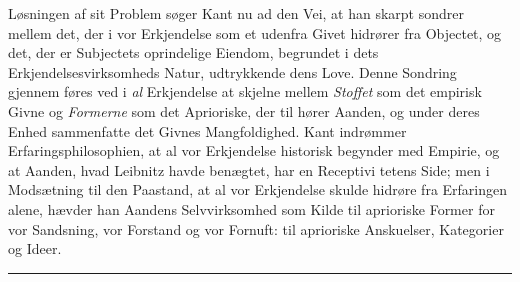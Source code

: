 \documentclass[12pt,a4paper]{book}
\newcommand{\divrule}{\begin{center}\rule{2cm}{0.4pt}\end{center}}
\begin{document}
Løsningen af sit Problem søger Kant nu ad den Vei, at
han skarpt sondrer mellem det, der i vor Erkjendelse som et
udenfra Givet hidrører fra Objectet, og det, der er Subjectets
oprindelige Eiendom, begrundet i dets Erkjendelsesvirksomheds
Natur, udtrykkende dens Love. Denne Sondring gjennem\-%
føres ved i \emph{al} Erkjendelse at skjelne mellem \emph{Stoffet} som det
empirisk Givne og \emph{Formerne} som det Aprioriske, der til\-%
hører Aanden, og under deres Enhed sammenfatte det Givnes
Mangfoldighed. Kant indrømmer Erfaringsphilosophien, at
al vor Erkjendelse historisk begynder med Empirie, og at
Aanden, hvad Leibnitz havde benægtet, har en Receptivi\-%
tetens Side; men i Modsætning til den Paastand, at al vor
Erkjendelse skulde hidrøre fra Erfaringen alene, hævder han
Aandens Selvvirksomhed som Kilde til aprioriske Former for
vor Sandsning, vor Forstand og vor Fornuft: til aprioriske
Anskuelser, Kategorier og Ideer.

\divrule
\end{document}
